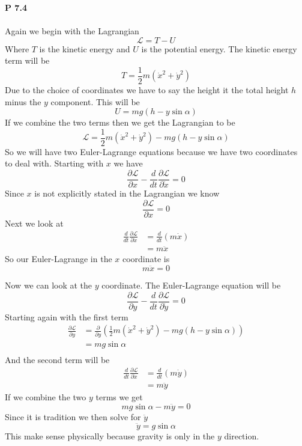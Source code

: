 \documentclass[11pt, leqno]{article}
\begin{document}
\bigskip

\noindent \textbf{P 7.4} \\

{\centering
\fbox{ 
\begin{minipage}{4in} 
\hfill\vspace{2in} 
\end{minipage} } \\
}
\bigskip 
Again we begin with the Lagrangian 
$$ 
\mathcal{L} = T - U 
$$ 
Where $T$ is the kinetic energy and $U$ is the potential energy. The kinetic energy term will be 
$$ 
T = \frac{1}{2}m(\dot{x}^2 + \dot{y}^2)
$$
Due to the choice of coordinates we have to say the height it the total height $h$ minus the $y$ component. This will be 
$$
U = mg(h - y \sin \alpha)
$$
If we combine the two terms then we get the Lagrangian to be 
$$ 
\mathcal{L} = \frac{1}{2}m(\dot{x}^2 + \dot{y}^2) - mg(h - y \sin \alpha)
$$
So we will have two Euler-Lagrange equations because we have two coordinates to deal with. Starting with $x$ we have 
$$
\frac{\partial \mathcal{L}}{\partial x} - \frac{d}{dt}\frac{\partial \mathcal{L}}{\partial \dot{x}} = 0
$$
Since $x$ is not explicitly stated in the Lagrangian we know 
$$
\frac{\partial \mathcal{L}}{\partial x} = 0
$$
Next we look at 
\begin{align*}
\frac{d}{dt}\frac{\partial \mathcal{L}}{\partial \dot{x}} &=  \frac{d}{dt}\left(m\dot{x} \right) \\
&= m \ddot{x}
\end{align*}
So our Euler-Lagrange in the $x$ coordinate is
$$
\boxed{m\ddot{x} = 0}
$$

Now we can look at the $y$ coordinate. The Euler-Lagrange equation will be 
$$
\frac{\partial \mathcal{L}}{\partial y} - \frac{d}{dt}\frac{\partial \mathcal{L}}{\partial \dot{y}} = 0
$$
Starting again with the first term 
\begin{align*}
\frac{\partial \mathcal{L}}{\partial y} &= \frac{\partial}{\partial y }\left( \frac{1}{2}m(\dot{x}^2 + \dot{y}^2) - mg(h - y \sin \alpha) \right)\\
&= mg \sin \alpha \\
\end{align*}
And the second term will be 
\begin{align*}
\frac{d}{dt}\frac{\partial \mathcal{L}}{\partial \dot{x}} &=  \frac{d}{dt}\left(m\dot{y} \right) \\
&= m \ddot{y}
\end{align*}
If we combine the two $y$ terms we get 
$$
mg \sin \alpha - m\ddot{y} = 0
$$
Since it is tradition we then solve for $\ddot{y}$
$$
\boxed{\ddot{y} = g \sin \alpha}
$$
This make sense physically because gravity is only in the $y$ direction.
\end{document}
